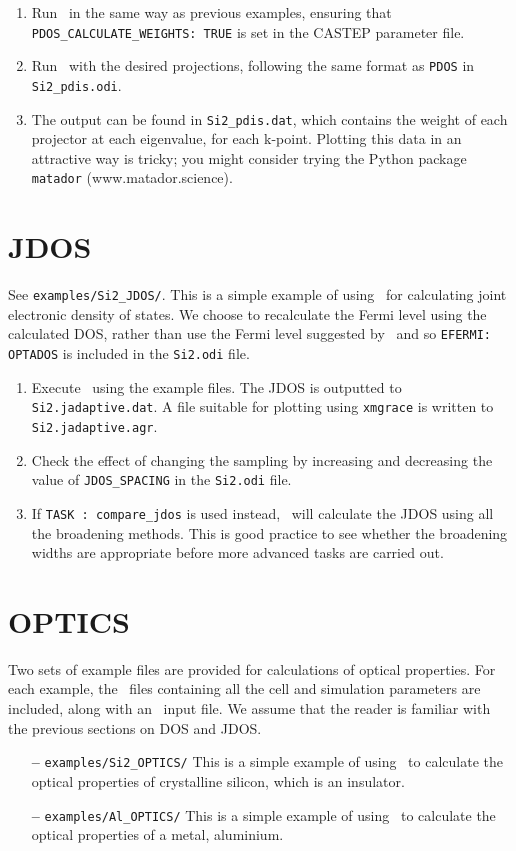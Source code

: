 \documentclass[a4paper,11pt,twoside]{book}
\begin{document}
{\begin{enumerate}
\item Run \castep\ in the same way as previous examples, ensuring that \verb#PDOS_CALCULATE_WEIGHTS: TRUE# is set in the CASTEP parameter file.
\item Run \optados\ with the desired projections, following the same format as \verb#PDOS# in \verb#Si2_pdis.odi#.
\item The output can be found in \verb#Si2_pdis.dat#, which contains the weight of each projector at each eigenvalue, for each k-point. Plotting this data in an attractive way is tricky; you might consider trying the Python package \verb#matador# (www.matador.science).
\end{enumerate}

\section{JDOS}
See  \verb#examples/Si2_JDOS/#. This is a simple example of using \optados\ for calculating joint electronic density of states.  We choose to recalculate the Fermi level using the calculated DOS, rather than use the Fermi level suggested by \castep\, and so \verb#EFERMI: OPTADOS# is included in the \verb#Si2.odi# file.
\begin{enumerate}
\item Execute \optados\ using the example files.  The JDOS is outputted to {\tt Si2.jadaptive.dat}. A file suitable for plotting using {\tt xmgrace} is written to {\tt Si2.jadaptive.agr}.
\item Check the effect of changing the sampling by increasing and decreasing the value of \verb#JDOS_SPACING# in the \verb#Si2.odi# file.
\item If {\tt TASK : compare\_jdos} is used instead, \optados\ will calculate the JDOS using all the broadening methods.  This is good practice to see whether the broadening widths are appropriate before more advanced tasks are carried out.
\end{enumerate}

\section{OPTICS}
Two sets of example files are provided for calculations of optical properties.  For each example, the \castep\ files containing all the cell and simulation parameters are included, along with an \optados\ input file. We assume that the reader is familiar with the previous sections on DOS and JDOS.
\begin{itemize}
\item[{\bf --}]  \verb#examples/Si2_OPTICS/#  This is a simple example of using \optados\ to calculate the optical properties of crystalline silicon, which is an insulator.
\item[{\bf --}]\verb#examples/Al_OPTICS/#  This is a simple example of using \optados\ to calculate the optical properties of a metal, aluminium.
\end{itemize}

}
\end{document}
